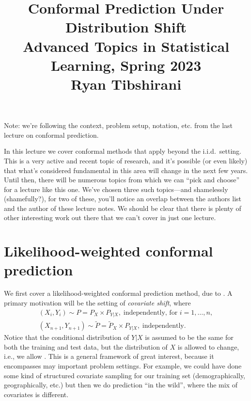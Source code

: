 \documentclass{article}
\title{Conformal Prediction Under Distribution Shift \\ \smallskip
\large Advanced Topics in Statistical Learning, Spring 2023 \\ \smallskip
Ryan Tibshirani }
\date{}
\begin{document}
\maketitle
\RaggedRight
\vspace{-50pt}

Note: we're following the context, problem setup, notation, etc. from the last
lecture on conformal prediction.

In this lecture we cover conformal methods that apply beyond the i.i.d.\
setting. This is a very active and recent topic of research, and it's possible
(or even likely) that what's considered fundamental in this area will change in
the next few years. Until then, there will be numerous topics from which we can
``pick and choose'' for a lecture like this one. We've chosen three such
topics---and shamelessly (shamefully?), for two of these, you'll notice an 
overlap between the authors list and the author of these lecture notes. We
should be clear that there is plenty of other interesting work out there that we
can't cover in just one lecture. 

\section{Likelihood-weighted conformal prediction}

\def\tP{\tilde{P}}

We first cover a likelihood-weighted conformal prediction method, due to
\citet{tibshirani2019conformal}. A primary motivation will be the setting of  
\emph{covariate shift}, where 
\begin{equation}
\label{eq:cov_shift}
\begin{gathered}
(X_i, Y_i) \sim P = P_X \times P_{Y|X}, \; \text{independently, for
  $i=1,\dots,n$}, \\ 
(X_{n+1}, Y_{n+1}) \sim \tP = \tP_X \times P_{Y|X}, \; \text{independently}. 
\end{gathered}
\end{equation}
Notice that the conditional distribution of $Y|X$ is assumed to be the same for
both the training and test data, but the distribution of $X$ is allowed to
change, i.e., we allow \smash{$\tP_X \not= P_X$}. This is a general framework of
great interest, because it encompasses may important problem settings. For
example, we could have done some kind of structured covariate sampling for our
training set (demographically, geographically, etc.) but then we do prediction
``in the wild'', where the mix of covariates is different.
\end{document}
